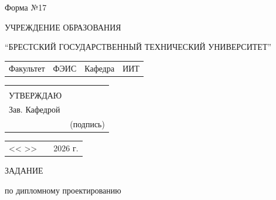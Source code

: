 \documentclass[12pt, А4, twoside]{article}
\begin{document}
\begin{FlushRight} {\fontsize{11}{0}\selectfont \cyrillicfont
        Форма №17 \hspace{0.4 cm}
} \end{FlushRight}

\begin{Center} {\fontsize{14}{0}\selectfont \cyrillicfont
        УЧРЕЖДЕНИЕ ОБРАЗОВАНИЯ
        \par
        “БРЕСТСКИЙ ГОСУДАРСТВЕННЫЙ ТЕХНИЧЕСКИЙ УНИВЕРСИТЕТ”
} \end{Center}

\begin{FlushLeft}
\fontsize{12}{15}

    \begin{tabular}{p{1.8cm} p{6.2cm} p{2.0cm} p{6.0cm}}
        \textsf{Факультет} &
        \centering \textsf{ФЭИС} \vspace{0pt} \hline &
        \textsf{Кафедра} &
        \centering \textsf{ИИТ} \vspace{0pt} \hline
    \end{tabular}

    \begin{tabular}{p{2.5cm} p{5.5cm}}
        & \\
        \textsf{УТВЕРЖДАЮ} & \\
        \textsf{Зав. Кафедрой} & \vspace{0pt} \hline \\
        \hspace{2.8cm} &  \centering \textsf{(подпись)}
    \end{tabular}

\vspace{-0.4 cm}

    \begin{tabular}{p{1.0cm} p{5.0cm} p{2.0cm}}
        \textsf{<< \hspace{4mm} >>} &
        \vspace{0pt} \hline &
        \textsf{2026 г.} \\
    \end{tabular}

\end{FlushLeft}

\begin{Center}
    \fontsize{24}{30} \textsf{ЗАДАНИЕ}
    \par 
    \fontsize{14}{17.5} \textrm{по дипломному проектированию}
\end{Center}
\end{document}
